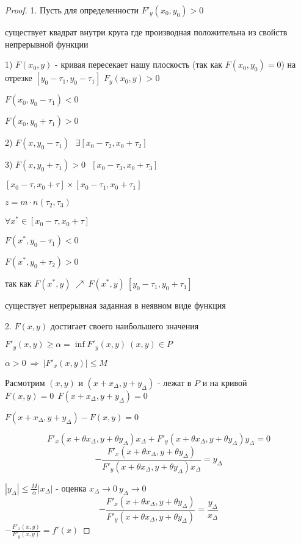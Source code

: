 \begin{proof}
  1. Пусть для определенности $F'_y(x_0, y_0) > 0$

  существует квадрат внутри круга где производная положительна из свойств
  непрерывной функции

  1) $F(x_0, y)$ - кривая пересекает нашу плоскость (так как $F(x_0, y_0) = 0$)
  на отрезке $[y_0 - \tau_1, y_0 - \tau_1]$ $F_y(x_0, y) > 0$

  $F(x_0, y_0 - \tau_1) < 0$

  $F(x_0, y_0 + \tau_1) > 0$

  2) $F(x, y_0 - \tau_1) ~~~ \exists [x_0 - \tau_2, x_0 + \tau_2]$

  3) $F(x, y_0 + \tau_1) > 0 ~~~ [x_0 - \tau_3, x_0 + \tau_3]$

  $[x_0 - \tau, x_0 + \tau] \times [x_0 - \tau_1, x_0 + \tau_1]$

  $z = m \cdot n(\tau_2, \tau_3)$

  $\forall x^* \in [x_0 - \tau, x_0 + \tau]$

  $F(x^*, y_0 - \tau_1) < 0$

  $F(x^*, y_0 + \tau_2) > 0$

  так как $F(x^*, y) ~ \nearrow ~ F(x^*, y) ~ [y_0 - \tau_1, y_0 + \tau_1]$

  существует непрерывная заданная в неявном виде функция

  2. $F(x, y)$ достигает своего наибольшего значения

  $F'_y(x, y) \ge \alpha = \inf F'_y (x, y) ~ (x, y) \in P$

  $\alpha > 0 ~ \Rightarrow ~ |F'_x (x, y)| \le M$

  Расмотрим $(x, y)$ и $(x + x_{\Delta}, y + y_{\Delta})$ - лежат в $P$ и на
  кривой $F(x, y) = 0 ~~ F(x + x_{\Delta}, y + y_{\Delta}) = 0$

  $F(x + x_{\Delta}, y + y_{\Delta}) - F(x, y) = 0$

  $$
  F'_x (x + \theta x_{\Delta}, y + \theta y_{\Delta})x_{\Delta} +
  F'_y(x + \theta x_{\Delta}, y + \theta y_{\Delta})y_{\Delta} = 0
  $$
  $$
  - \frac{F'_x (x + \theta x_{\Delta}, y + \theta y_{\Delta})}
  {F'_y(x + \theta x_{\Delta}, y + \theta y_{\Delta})x_{\Delta}} = y_{\Delta}
  $$

  $|y_{\Delta}| \le \frac{M}{\alpha} |x_{\Delta}|$ - оценка
  $x_{\Delta} \to 0 ~ y_{\Delta} \to 0$
  $$
  - \frac{F'_x (x + \theta x_{\Delta}, y + \theta y_{\Delta})}
  {F'_y(x + \theta x_{\Delta}, y + \theta y_{\Delta})} =
  \frac{y_{\Delta}}{x_{\Delta}}
  $$
  $- \frac{F'_x (x, y)}{F'_y(x, y)} = f'(x)$
\end{proof}

